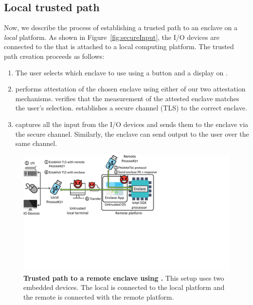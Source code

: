 


\subsection{Local trusted path} 

Now, we describe the process of establishing a trusted path to an enclave on a \emph{local} platform. As shown in Figure~\ref{fig:secureInput}, the I/O devices are connected to the \device that is attached to a local computing platform. The trusted path creation proceeds as follows:

\begin{enumerate}
    \item[\one] The user selects which enclave to use using a button and a display on \device.
    \item[\two] \device performs attestation of the chosen enclave using either of our two attestation mechanisms. \device verifies that the measurement of the attested enclave matches the user's selection. \device establishes a secure channel (TLS) to the correct enclave.
    \item[\three] \device captures all the input from the I/O devices and sends them to the enclave via the secure channel. Similarly, the enclave can send output to the user over the same channel.
\end{enumerate}
 

\begin{figure}[t]
 \centering
  \includegraphics[trim={0 8cm 12cm 0},clip,width=0.85\linewidth]{chapters/ProximiTEE/images_new/SystemDesignRemote.pdf}
 \caption[Trusted path to a remote enclave using \device]{\textbf{Trusted path to a remote enclave using \device.} This setup uses two embedded devices. The local \device is connected to the local platform and the remote \device is connected with the remote platform.}
 \label{fig:systemRemoteHost}
\end{figure}

